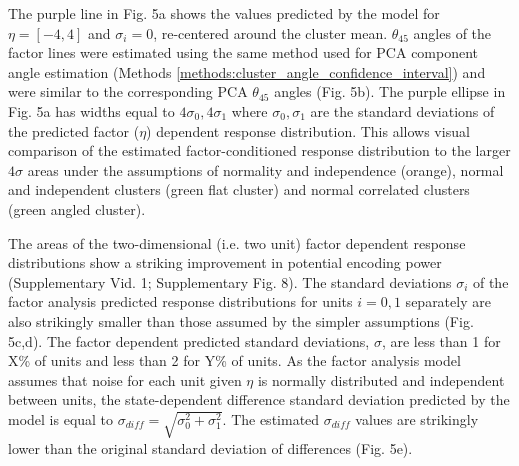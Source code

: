 \documentclass{article}
\begin{document}
The purple line in Fig. 5a shows the values predicted by the model for $\eta = [-4, 4]$ and $\sigma_i = 0$, re-centered around the cluster mean. $\theta_{45}$ angles of the factor lines were estimated using the same method used for PCA component angle estimation (Methods \ref{methods:cluster_angle_confidence_interval}) and were similar to the corresponding PCA $\theta_{45}$ angles (Fig. 5b). The purple ellipse in Fig. 5a has widths equal to $4\sigma_0, 4\sigma_1$ where  $\sigma_0, \sigma_1$ are the standard deviations of the predicted factor ($\eta$) dependent response distribution. This allows visual comparison of the estimated factor-conditioned response distribution to the larger $4\sigma$ areas under the assumptions of normality and independence (orange), normal and independent clusters (green flat cluster) and normal correlated clusters (green angled cluster). 

The areas of the two-dimensional (i.e. two unit) factor dependent response distributions show a striking improvement in potential encoding power (Supplementary Vid. 1; Supplementary Fig. 8). The standard deviations $\sigma_i$ of the factor analysis predicted response distributions for units $i = 0,1$ separately are also strikingly smaller than those assumed by the simpler assumptions (Fig. 5c,d). The factor dependent predicted standard deviations, $\sigma$, are less than 1 for X\% of units and less than 2 for Y\% of units. 
As the factor analysis model assumes that noise for each unit given $\eta$ is normally distributed and independent between units, the state-dependent difference standard deviation predicted by the model is equal to \(\sigma_{diff} = \sqrt{\sigma_{0}^2 + \sigma_{1}^2}\).
The estimated $\sigma_{diff}$ values are strikingly lower than the original standard deviation of differences (Fig. 5e). 

\end{document}
